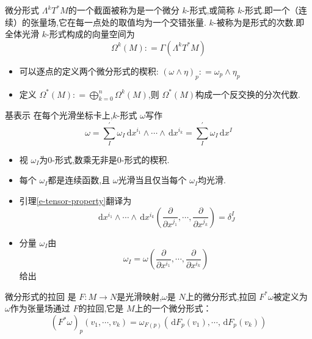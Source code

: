 \documentclass[../../几何与拓扑.tex]{subfiles}
\begin{document}
\begin{definition}{微分形式}
     $  \Lambda ^{k}T^{*}M $的一个截面被称为是一个微分 $ k $-形式,或简称 $ k $-形式.即一个（连续）的张量场,它在每一点处的取值均为一个交错张量. $ k $-被称为是形式的次数.即全体光滑 $ k $-形式构成的向量空间为 $$
      \Omega ^{k}\left( M \right): =  \Gamma \left(  \Lambda ^{k}T^{*}M \right)  
     $$   
\end{definition}

\begin{remark}
    \begin{itemize}
        \item 可以逐点的定义两个微分形式的楔积: $ \left(  \omega \wedge \eta  \right)_{p}: =  \omega _{p}\wedge \eta _{p}  $ 
        \item 定义 $  \Omega ^{*}\left( M \right): = \bigoplus_{k=0}^{n} \Omega ^{k}\left( M \right)   $,则 $  \Omega ^{*}\left( M \right)  $构成一个反交换的分次代数.  
    \end{itemize}
    
\end{remark}

\begin{proposition}{基表示}
    在每个光滑坐标卡上,$ k $-形式 $  \omega  $写作 $$
     \omega = \sum _{I}^{\prime}  \omega _{I} \,\mathrm{d} x^{i_1}\wedge \cdots \wedge \,\mathrm{d} x^{i_{k}} = \sum _{I}^{\prime}  \omega _{I}\,\mathrm{d} x^{I}
    $$  
\end{proposition}
\begin{remark}
 \begin{itemize}
    \item 视 $ \omega _{I} $为0-形式,数乘无非是0-形式的楔积. 
    \item 每个 $ \omega _{I} $都是连续函数,且 $ \omega  $光滑当且仅当每个 $ \omega _{I} $均光滑.
    \item 引理\ref{e-tensor-property}翻译为 $$
    \,\mathrm{d} x^{i_1}\wedge \cdots \wedge \,\mathrm{d} x^{i_{k}}\left( \frac{\partial }{\partial x^{j_1}},\cdots ,\frac{\partial }{\partial x^{j_{k}}} \right) = \delta _{J}^{I}
    $$   
    \item 分量 $ \omega _{I} $由 $$
    \omega _{I} = \omega \left( \frac{\partial }{\partial x^{i_1}},\cdots ,\frac{\partial }{\partial x^{i_{k}}} \right) 
    $$给出 
 \end{itemize}

\end{remark}

\begin{definition}{微分形式的拉回}
    是 $ F:M\to N $是光滑映射,$ \omega  $是 $ N $上的微分形式,拉回 $ F^{*}\omega  $被定义为 $ \omega  $作为张量场通过 $ F $的拉回,它是 $ M $上的一个微分形式： $$
    \left( F^{*}\omega  \right)_{p}\left(  v_1,\cdots,v_k  \right) = \omega _{F\left( p \right) }  \left( \,\mathrm{d} F_{p}\left( v_1 \right),\cdots ,\,\mathrm{d} F_{p}\left( v_{k} \right)   \right) 
    $$       
\end{definition}
\end{document}
